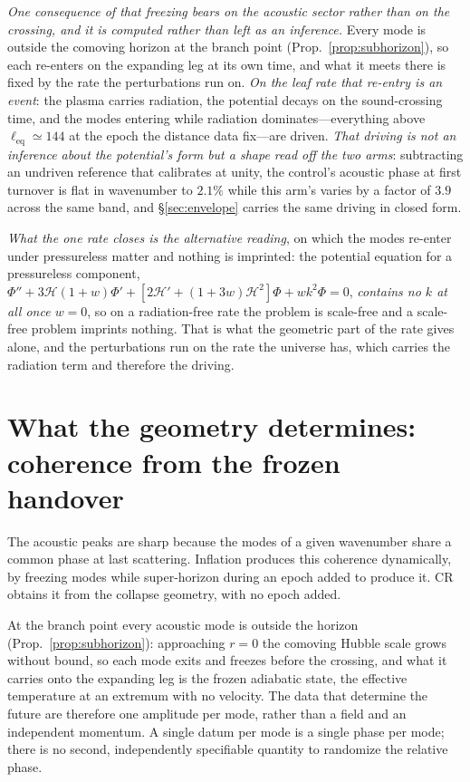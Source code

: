 \documentclass[11pt,a4paper]{article}
\theoremstyle{plain}
\theoremstyle{definition}
\theoremstyle{remark}
\begin{document}
\emph{One consequence of that freezing bears on the acoustic sector rather than on the crossing, and it is
computed rather than left as an inference.} Every mode is outside the comoving horizon at the branch point
(Prop.~\ref{prop:subhorizon}), so each re-enters on the expanding leg at its own time, and what it meets
there is fixed by the rate the perturbations run on. \emph{On the leaf rate that re-entry is an event}: the
plasma carries radiation, the potential decays on the sound-crossing time, and the modes entering while
radiation dominates---everything above $\ell_{\mathrm{eq}}\simeq144$ at the epoch the distance data fix---are
driven. \emph{That driving is not an inference about the potential's form but a shape read off the two
arms}: subtracting an undriven reference that calibrates at unity, the control's acoustic phase at first
turnover is flat in wavenumber to $2.1\%$ while this arm's varies by a factor of
$3.9$ across the same band, and \S\ref{sec:envelope} carries the
same driving in closed form.

\emph{What the one rate closes is the alternative reading}, on which the modes re-enter under pressureless
matter and nothing is imprinted: the potential equation for a pressureless component,
$\Phi''+3\mathcal{H}(1+w)\Phi'+[2\mathcal{H}'+(1+3w)\mathcal{H}^{2}]\Phi+wk^{2}\Phi=0$, \emph{contains no $k$
at all once $w=0$}, so on a radiation-free rate the problem is scale-free and a scale-free problem imprints
nothing. That is what the geometric part of the rate gives alone, and the
perturbations run on the rate the universe has, which carries the radiation term and therefore the
driving.

\section{What the geometry determines: coherence from the frozen handover}\label{sec:coherence}

The acoustic peaks are sharp because the modes of a given wavenumber share a common phase at last scattering. Inflation produces this coherence dynamically, by freezing modes while super-horizon during an epoch added to produce it. CR obtains it from the collapse geometry, with no epoch added.

At the branch point every acoustic mode is outside the horizon (Prop.~\ref{prop:subhorizon}): approaching $r=0$ the comoving Hubble scale grows without bound, so each mode exits and freezes before the crossing, and what it carries onto the expanding leg is the frozen adiabatic state, the effective temperature at an extremum with no velocity. The data that determine the future are therefore one amplitude per mode, rather than a field and an independent momentum. A single datum per mode is a single phase per mode; there is no second, independently specifiable quantity to randomize the relative phase. 
\end{document}
